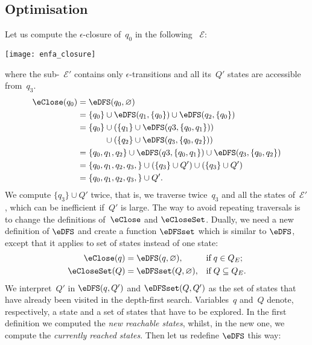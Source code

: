 \subsection*{Optimisation}
\label{enfa_closure}

Let us compute the \(\epsilon\)-closure of~\(q_0\) in the following
\eNFA~\(\mathcal{E}\):
\begin{center}
\texttt{[image: enfa\_closure]}
\end{center}
where the sub-\eNFA~\(\mathcal{E'}\) contains only
\(\epsilon\)-transitions and all its~\(Q'\) states are accessible
from~\(q_3\).
\begin{align*}
   \eClose (q_0)
&= \eDFS (q_0, \varnothing)\\
&= \{q_0\} \cup \eDFS (q_1, \{q_0\}) \cup \eDFS (q_2, \{q_0\})\\
&= \{q_0\} \cup (\{q_1\} \cup \eDFS (q3, \{q_0, q_1\}))\\
&\mathrel{\phantom{=}} \phantom{\{q_0\}}{} \cup (\{q_2\} \cup \eDFS
   (q_3, \{q_0, q_2\}))\\
&= \{q_0, q_1, q_2\} \cup \eDFS (q3, \{q_0, q_1\}) \cup \eDFS
   (q_3, \{q_0, q_2\})\\
&= \{q_0, q_1, q_2, q_3,\} \cup (\{q_3\} \cup Q') \cup (\{q_3\} \cup Q')\\
&= \{q_0, q_1, q_2, q_3,\} \cup Q'.
\end{align*}
We compute \(\{q_3\} \cup Q'\) twice, that is, we traverse
twice~\(q_3\) and all the states of~\(\mathcal{E'}\), which can be
inefficient if~\(Q'\) is large. The way to avoid repeating traversals
is to change the definitions of~\(\eClose\) and
\(\eCloseSet\). Dually, we need a new definition of \(\eDFS\) and
create a function \(\eDFSset\) which is similar to \(\eDFS\), except
that it applies to set of states instead of one state:
\begin{align*}
   \eClose (q)
&= \eDFS (q, \varnothing),
&& \text{if} \; q \in Q_E;\\
   \eCloseSet (Q)
&= \eDFSset (Q, \varnothing),
&& \text{if} \; Q \subseteq Q_E.
\end{align*}
We interpret~\(Q'\) in \(\eDFS (q, Q')\) and \(\eDFSset (Q, Q')\) as
the set of states that have already been visited in the depth-first
search. Variables~\(q\) and~\(Q\) denote, respectively, a state and a
set of states that have to be explored. In the first definition we
computed the \emph{new reachable states}, whilst, in the new one, we
compute the \emph{currently reached states}. Then let us redefine
\(\eDFS\) this way:
